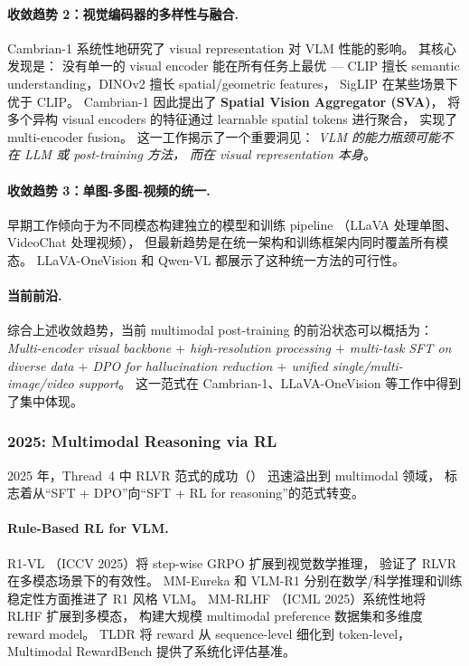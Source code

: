 \paragraph{收敛趋势 2：视觉编码器的多样性与融合.}
Cambrian-1 \cite{tong2024cambrian} 系统性地研究了 visual representation 对 VLM 性能的影响。
其核心发现是：
没有单一的 visual encoder 能在所有任务上最优 ---
CLIP 擅长 semantic understanding，DINOv2 擅长 spatial/geometric features，
SigLIP 在某些场景下优于 CLIP。
Cambrian-1 因此提出了 \textbf{Spatial Vision Aggregator (SVA)}，
将多个异构 visual encoders 的特征通过 learnable spatial tokens 进行聚合，
实现了 multi-encoder fusion。
这一工作揭示了一个重要洞见：
\textit{VLM 的能力瓶颈可能不在 LLM 或 post-training 方法，
而在 visual representation 本身}。

\paragraph{收敛趋势 3：单图-多图-视频的统一.}
早期工作倾向于为不同模态构建独立的模型和训练 pipeline
（LLaVA 处理单图、VideoChat 处理视频），
但最新趋势是在统一架构和训练框架内同时覆盖所有模态。
LLaVA-OneVision \cite{li2024llava-onevision} 和
Qwen-VL \cite{bai2023qwen-vl} 都展示了这种统一方法的可行性。

\paragraph{当前前沿.}
综合上述收敛趋势，当前 multimodal post-training 的前沿状态可以概括为：
\textit{Multi-encoder visual backbone $+$ high-resolution processing $+$
multi-task SFT on diverse data $+$ DPO for hallucination reduction $+$
unified single/multi-image/video support}。
这一范式在 Cambrian-1、LLaVA-OneVision 等工作中得到了集中体现。

\subsubsection{2025: Multimodal Reasoning via RL}
\label{sec:t5-reasoning-rl}

2025 年，Thread~4 中 RLVR 范式的成功（）
迅速溢出到 multimodal 领域，
标志着从``SFT + DPO''向``SFT + RL for reasoning''的范式转变。

\paragraph{Rule-Based RL for VLM.}
R1-VL \cite{zhang2025r1vl}（ICCV 2025）将 step-wise GRPO 扩展到视觉数学推理，
验证了 RLVR 在多模态场景下的有效性。
MM-Eureka \cite{meng2025mmeureka} 和 VLM-R1 \cite{shen2025vlmr1}
分别在数学/科学推理和训练稳定性方面推进了 R1 风格 VLM。
MM-RLHF \cite{zhang2025mmrlhf}（ICML 2025）系统性地将 RLHF 扩展到多模态，
构建大规模 multimodal preference 数据集和多维度 reward model。
TLDR \cite{fu2025tldr} 将 reward 从 sequence-level 细化到 token-level，
Multimodal RewardBench \cite{yasunaga2025mmrewardbench} 提供了系统化评估基准。

